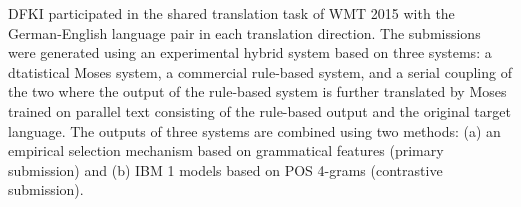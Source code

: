 DFKI participated in the shared translation task of WMT 2015 with the German-English language pair in each translation direction. The submissions were generated using an experimental hybrid system based on three systems: a dtatistical Moses system, a commercial rule-based system, and a serial coupling of the two where the output of the rule-based system is further translated by Moses trained on parallel text consisting of the rule-based output and the original target language. The outputs of three systems are combined using two methods: (a) an empirical selection mechanism based on grammatical features (primary submission) and (b) IBM 1 models based on POS 4-grams (contrastive submission).
